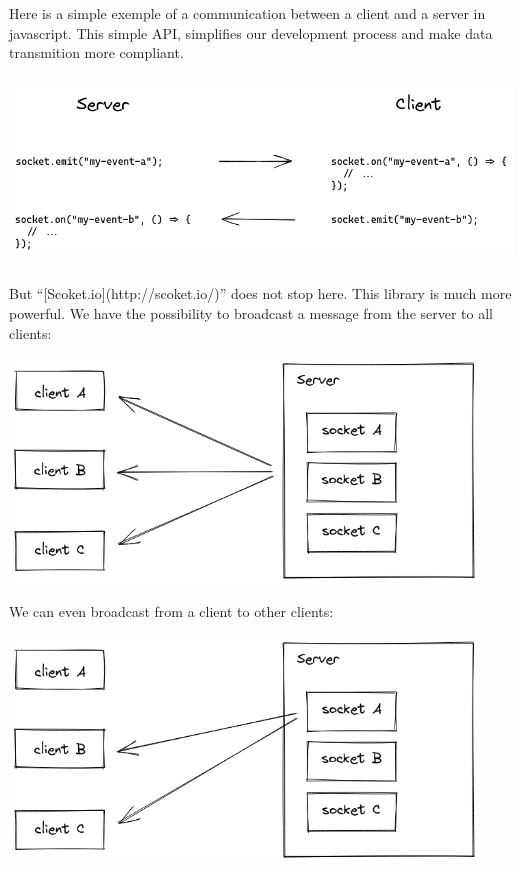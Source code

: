 \documentclass[12pt]{article}
\begin{document}
Here is a simple exemple of a communication between a client and a server in javascript. This simple API, simplifies our development process and make data transmition more compliant.\\

\centerline{\includegraphics[height=5cm]{../../docs/server-client.png}}

But “[Scoket.io](http://scoket.io/)” does not stop here. This library is much more powerful. We have the possibility to broadcast a message from the server to all clients:\\ 

\centerline{\includegraphics[height=6cm]{../../docs/broadcast-0.png}}

We can even broadcast from a client to other clients:\\

\centerline{\includegraphics[height=6cm]{../../docs/broadcast-1.png}}
\end{document}
